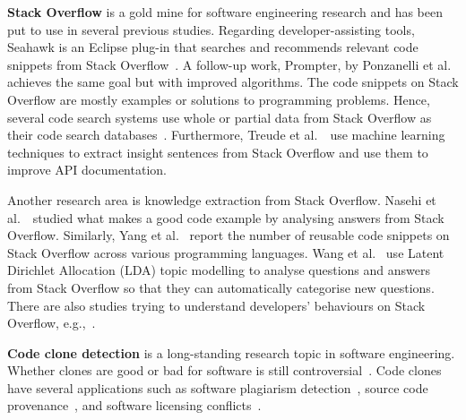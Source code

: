 \documentclass[10pt,journal,compsoc]{IEEEtran}
\begin{document}
\textbf{Stack Overflow} is a gold mine for software engineering
research and
has been put to
use in several previous studies. Regarding developer-assisting
tools, Seahawk is an Eclipse plug-in that searches and recommends
relevant code snippets from Stack Overflow~\cite{Ponzanelli2013}. A
follow-up work, Prompter, by Ponzanelli et al.~\cite{Ponzanelli2014}
achieves the same goal but with improved algorithms. The code snippets
on Stack Overflow are mostly examples or solutions to programming
problems. Hence, several code search systems use whole or partial data
from Stack Overflow as their code search
databases~\cite{Keivanloo2014,Park2014,
	Stolee2014,Subramanian2013,Diamantopoulos2015}. Furthermore, Treude
et al.~\cite{Treude2016}~use machine learning techniques to extract
insight sentences from Stack Overflow and use them to improve API
documentation.

Another research area is knowledge extraction from Stack
Overflow. Nasehi et al.~\cite{Nasehi2012}~studied what makes a good
code example by analysing answers from Stack Overflow. Similarly, Yang
et al.~\cite{Yang2016} report the number of reusable code snippets on
Stack Overflow across various programming languages. Wang et
al.~\cite{Wang2013_StackOverflow} use Latent Dirichlet Allocation
(LDA) topic modelling to analyse questions and answers from Stack
Overflow so that they can automatically categorise new
questions. There are also studies trying to understand developers'
behaviours on Stack Overflow,
e.g.,~\cite{Movshovitz-Attias2013,Rosen2016,Choetkiertikul2015,Bosu2013}.

\textbf{Code clone detection} is a long-standing research topic in
software engineering. Whether clones are good or bad for software is
still
controversial~\cite{Sajnani2016,Kapser2003,Kapser2008,Krinke2008,Hotta2010,Gode2011,Harder2013}.
Code clones have several
applications such as software plagiarism
detection~\cite{Prechelt2002}, source code
provenance~\cite{Davies2013}, and software licensing
conflicts~\cite{German2009}.
\end{document}
